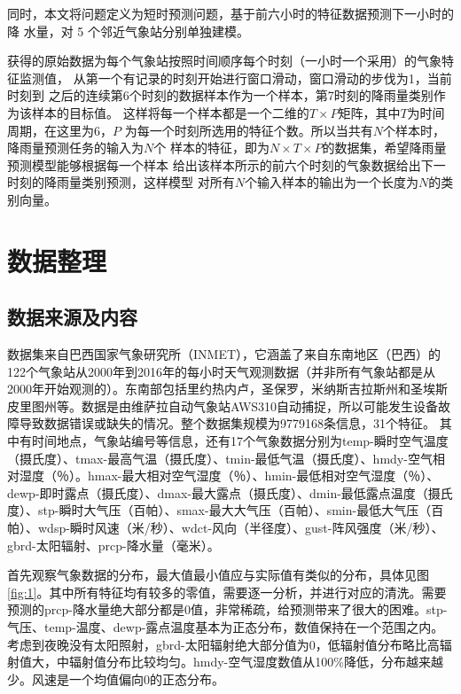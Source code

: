 \documentclass[UTF8]{ctexart}
\begin{document}
同时，本文将问题定义为短时预测问题，基于前六小时的特征数据预测下一小时的降
水量，对 5 个邻近气象站分别单独建模。

获得的原始数据为每个气象站按照时间顺序每个时刻（一小时一个采用）的气象特征监测值，
从第一个有记录的时刻开始进行窗口滑动，窗口滑动的步伐为1，当前时刻到
之后的连续第6个时刻的数据样本作为一个样本，第7时刻的降雨量类别作为该样本的目标值。
这样将每一个样本都是一个二维的$T\times P$矩阵，其中$T$为时间周期，在这里为6，$P$
为每一个时刻所选用的特征个数。所以当共有$N$个样本时，降雨量预测任务的输入为$N$个
样本的特征，即为$N\times T\times P$的数据集，希望降雨量预测模型能够根据每一个样本
给出该样本所示的前六个时刻的气象数据给出下一时刻的降雨量类别预测，这样模型
对所有$N$个输入样本的输出为一个长度为$N$的类别向量。

\section{数据整理}
\subsection{数据来源及内容}
\label{sec:data}
数据集来自巴西国家气象研究所（INMET），它涵盖了来自东南地区（巴西）的122个气象站从2000年到2016年的每小时天气观测数据（并非所有气象站都是从2000年开始观测的）。东南部包括里约热内卢，圣保罗，米纳斯吉拉斯州和圣埃斯皮里图州等。数据是由维萨拉自动气象站AWS310自动捕捉，所以可能发生设备故障导致数据错误或缺失的情况。整个数据集规模为9779168条信息，31个特征。 其中有时间地点，气象站编号等信息，还有17个气象数据分别为temp-瞬时空气温度（摄氏度）、tmax-最高气温（摄氏度）、tmin-最低气温（摄氏度）、hmdy-空气相对湿度（％）。hmax-最大相对空气湿度（％）、hmin-最低相对空气湿度（％）、dewp-即时露点（摄氏度）、dmax-最大露点（摄氏度）、dmin-最低露点温度（摄氏度）、stp-瞬时大气压（百帕）、smax-最大大气压（百帕）、smin-最低大气压（百帕）、wdsp-瞬时风速（米/秒）、wdct-风向（半径度）、gust-阵风强度（米/秒）、gbrd-太阳辐射、prcp-降水量（毫米）。

首先观察气象数据的分布，最大值最小值应与实际值有类似的分布，具体见图\ref{fig:1}。其中所有特征均有较多的零值，需要逐一分析，并进行对应的清洗。需要预测的prcp-降水量绝大部分都是0值，非常稀疏，给预测带来了很大的困难。stp-气压、temp-温度、dewp-露点温度基本为正态分布，数值保持在一个范围之内。考虑到夜晚没有太阳照射，gbrd-太阳辐射绝大部分值为0，低辐射值分布略比高辐射值大，中辐射值分布比较均匀。hmdy-空气湿度数值从100\%降低，分布越来越少。风速是一个均值偏向0的正态分布。
\end{document}
